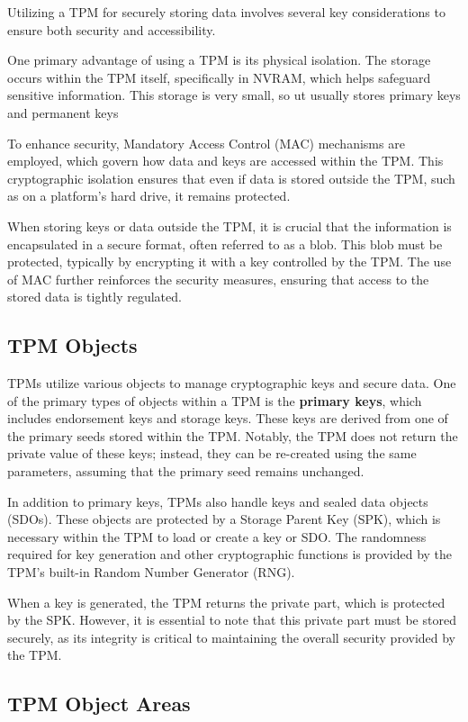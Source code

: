 Utilizing a TPM for securely storing data
involves several key considerations to ensure both security and
accessibility.

One primary advantage of using a TPM is its physical isolation. The
storage occurs within the TPM itself, specifically in NVRAM, which
helps safeguard sensitive information. This storage is very small, so
ut usually stores primary keys and permanent keys

To enhance security, Mandatory Access Control (MAC) mechanisms are
employed, which govern how data and keys are accessed within the TPM.
This cryptographic isolation ensures that even if data is stored
outside the TPM, such as on a platform's hard drive, it remains
protected.

When storing keys or data outside the TPM, it is crucial that the
information is encapsulated in a secure format, often referred to as a
blob. This blob must be protected, typically by encrypting it with a
key controlled by the TPM. The use of MAC further reinforces the
security measures, ensuring that access to the stored data is tightly
regulated.

\subsection{TPM Objects}

TPMs utilize various objects to manage cryptographic keys and secure
data. One of the primary types of objects within a TPM is the
\textbf{primary keys}, which includes endorsement keys and storage
keys. These keys are derived from one of the primary seeds stored
within the TPM. Notably, the TPM does not return the private value of
these keys; instead, they can be re-created using the same parameters,
assuming that the primary seed remains unchanged.

In addition to primary keys, TPMs also handle keys and sealed data
objects (SDOs). These objects are protected by a Storage Parent Key
(SPK), which is necessary within the TPM to load or create a key or
SDO. The randomness required for key generation and other
cryptographic functions is provided by the TPM's built-in Random
Number Generator (RNG). 

When a key is generated, the TPM returns the private part, which is
protected by the SPK. However, it is essential to note that this
private part must be stored securely, as its integrity is critical to
maintaining the overall security provided by the TPM.

\subsection{TPM Object Areas}

